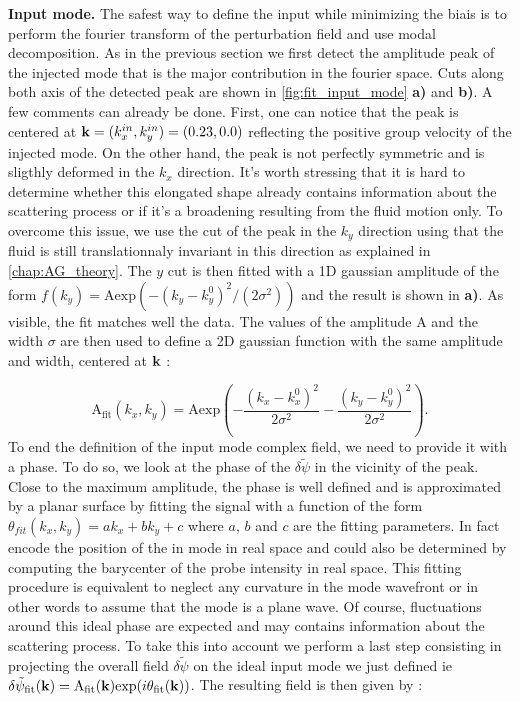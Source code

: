 \textbf{Input mode.} The safest way to define the input while minimizing the biais is to perform the fourier transform of the perturbation field and 
use modal decomposition. As in the previous section we first detect the amplitude peak of the injected mode that is the major contribution in the fourier space. Cuts along both axis of the detected peak are shown in \autoref{fig:fit_input_mode} \textbf{a)} and \textbf{b)}.
 A few comments can already be done. First, one can notice that the 
peak is centered at $\mathbf{k}=(k^{in}_x, k^{in}_y) = (0.23 , 0.0)$ reflecting the positive group velocity of the injected mode. On the other hand, the peak is not perfectly
symmetric and is sligthly deformed in the $k_x$ direction. It's worth stressing that it is hard to determine whether this elongated shape already contains
information about the scattering process or if it's a broadening resulting from the fluid motion only. To overcome this issue,
we use the cut of the peak in the $k_y$ direction using that the fluid is still translationnaly invariant in this direction as explained in \autoref{chap:AG_theory}.
The $y$ cut is then fitted with a 1D gaussian amplitude of the  form $f(k_y)=\mathrm{A}\mathrm{exp}(-(k_y-k_y^0)^2/(2\sigma^2))$ and the result is shown in \textbf{a)}.
As visible, the fit matches well the data. The values of the amplitude $\mathrm{A}$ and the width $\sigma$ are then used to define a 2D gaussian function with the same amplitude and width, centered 
at $\mathbf{k}$ : 

\begin{equation}
    \mathrm{A_{fit}}(k_x,k_y) = \mathrm{A} \mathrm{exp}(-\frac{(k_x-k_x^0)^2}{2\sigma^2}-\frac{(k_y-k_y^0)^2}{2\sigma^2}).
    \label{eq:gaussian_amp} 
\end{equation}
To end the definition of the input mode complex field, we need to provide it with a phase. To do so, we look at the phase of the $\delta \tilde{\psi}$ 
in the vicinity of the peak. Close to the maximum amplitude, the phase is well defined and is approximated by a planar surface by 
fitting the signal with a function of the form $\theta_{fit}(k_x, k_y)=ak_x+bk_y+c$ where $a$, $b$ and $c$ are the fitting parameters.
In fact encode the position of the in mode in real space and could also be determined by computing the barycenter
of the probe intensity in real space. This fitting procedure is equivalent to neglect any curvature 
in the mode wavefront or in other words to assume that the mode is a plane wave. Of course, fluctuations 
around this ideal phase are expected and may contains information about the scattering process. To take this into account we perform a last step 
consisting in projecting the overall field $\delta \tilde{\psi}$ on the ideal input mode we just defined ie $\delta \tilde{\psi}_{\mathrm{fit}}(\mathbf{k})= \mathrm{A_{fit}}(\mathbf{k})\mathrm{exp}(i\theta_{\mathrm{fit}}(\mathbf{k}))$.
The resulting field is then given by : 

